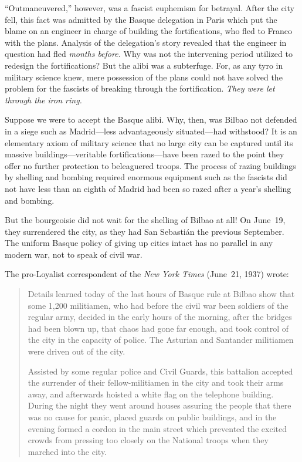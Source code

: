 ``Outmaneuvered,'' however, was a fascist euphemism for betrayal. After the city fell, this fact was admitted by the Basque delegation in Paris which put the blame on an engineer in charge of building the fortifications, who fled to Franco with the plans. Analysis of the delegation’s story revealed that the engineer in question had fled \emph{months before.} Why was not the intervening period utilized to redesign the fortifications? But the alibi was a subterfuge. For, as any tyro in military science knew, mere possession of the plans could not have solved the problem for the fascists of breaking through the fortification. \emph{They were let through the iron ring.}

Suppose we were to accept the Basque alibi. Why, then, was Bilbao not defended in a siege such as Madrid—less advantageously situated—had withstood? It is an elementary axiom of military science that no large city can be captured until its massive buildings—veritable fortifications—have been razed to the point they offer no further protection to beleaguered troops. The process of razing buildings by shelling and bombing required enormous equipment such as the fascists did not have less than an eighth of Madrid had been so razed after a year’s shelling and bombing.

But the bourgeoisie did not wait for the shelling of Bilbao at all! On June~19, they surrendered the city, as they had San Sebasti\'an the previous September. The uniform Basque policy of giving up cities intact has no parallel in any modern war, not to speak of civil war.

The pro-Loyalist correspondent of the \emph{New York Times} (June~21, 1937) wrote:

\begin{quotation}
  Details learned today of the last hours of Basque rule at Bilbao show that some 1,200 militiamen, who had before the civil war been soldiers of the regular army, decided in the early hours of the morning, after the bridges had been blown up, that chaos had gone far enough, and took control of the city in the capacity of police. The Asturian and Santander militiamen were driven out of the city.
  
  Assisted by some regular police and Civil Guards, this battalion accepted the surrender of their fellow-militiamen in the city and took their arms away, and afterwards hoisted a white flag on the telephone building. During the night they went around houses assuring the people that there was no cause for panic, placed guards on public buildings, and in the evening formed a cordon in the main street which prevented the excited crowds from pressing too closely on the National troops when they marched into the city.
\end{quotation}

